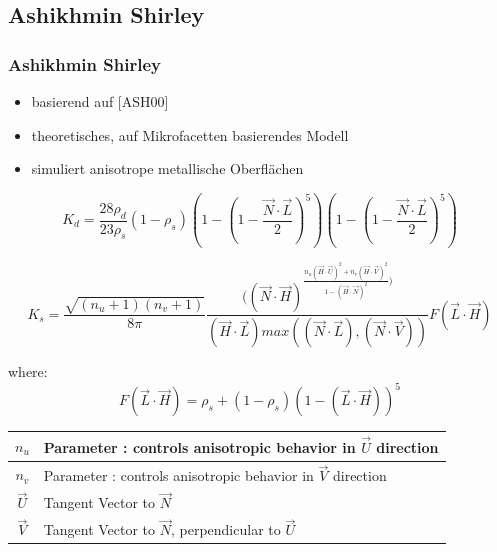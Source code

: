 \documentclass[11pt]{beamer}
\begin{document}
\subsection{Ashikhmin Shirley}
\begin{frame}[allowframebreaks]
\frametitle{Ashikhmin Shirley}
\begin{itemize}
\item basierend auf [ASH00]
\item theoretisches, auf Mikrofacetten basierendes Modell
\item simuliert anisotrope metallische Oberflächen
\end{itemize}

\begin{equation}
K_d = \frac{28 \rho_d}{23 \rho_s} (1 - \rho_s)\left(1-\left(1- \frac{\vec{N} \cdot \vec{L}}{2}\right)^5\right)\left(1-\left(1-\frac{\vec{N} \cdot \vec{L}}{2}\right)^5\right)
\end{equation}

\begin{equation}
K_s = \frac{\sqrt{(n_u+1)(n_v+1)}}{8\pi} \frac{((\vec{N} \cdot \vec{H})^{ \frac{n_u(\vec{H} \cdot \vec{U})^2 + n_v(\vec{H} \cdot \vec{V})^2}{1-(\vec{H} \cdot \vec{N})^2})}}{(\vec{H} \cdot \vec{L}) max((\vec{N} \cdot \vec{L}),(\vec{N} \cdot \vec{V}))} F(\vec{L} \cdot \vec{H})
\end{equation}

where:
\begin{equation}
F(\vec{L} \cdot \vec{H}) = \rho_s + (1-\rho_s)(1-(\vec{L} \cdot \vec{H}))^5
\end{equation}

\begin{table}[H]
\begin{tabular}{| c | l |}
\hline
$n_u$ & Parameter : controls anisotropic behavior in $\vec{U}$ direction\\ \hline
$n_v$ & Parameter : controls anisotropic behavior in $\vec{V}$ direction\\ \hline
$\vec{U}$ & Tangent Vector to $\vec{N}$\\ \hline
$\vec{V}$ & Tangent Vector to $\vec{N}$, perpendicular to $\vec{U}$\\ \hline
\end{tabular}
\end{table}


\end{frame}
\end{document}
